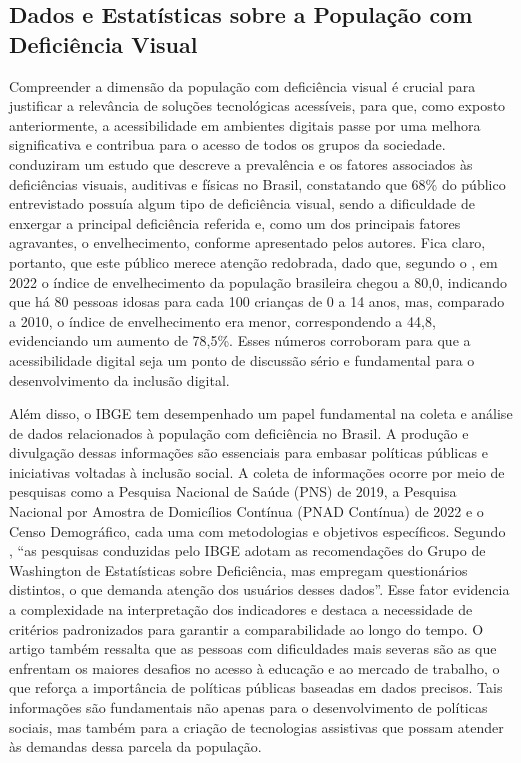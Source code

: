 \subsection{Dados e Estatísticas sobre a População com Deficiência Visual}

Compreender a dimensão da população com deficiência visual é crucial para justificar a relevância de soluções tecnológicas acessíveis, para que, como exposto anteriormente, a acessibilidade em ambientes digitais passe por uma melhora significativa e contribua para o acesso de todos os grupos da sociedade.  conduziram um estudo que descreve a prevalência e os fatores associados às deficiências visuais, auditivas e físicas no Brasil, constatando que 68\% do público entrevistado possuía algum tipo de deficiência visual, sendo a dificuldade de enxergar a principal deficiência referida e, como um dos principais fatores agravantes, o envelhecimento, conforme apresentado pelos autores. Fica claro, portanto, que este público merece atenção redobrada, dado que, segundo o , em 2022 o índice de envelhecimento da população brasileira chegou a 80,0, indicando que há 80 pessoas idosas para cada 100 crianças de 0 a 14 anos, mas, comparado a 2010, o índice de envelhecimento era menor, correspondendo a 44,8, evidenciando um aumento de 78,5\%. Esses números corroboram para que a acessibilidade digital seja um ponto de discussão sério e fundamental para o desenvolvimento da inclusão digital.

Além disso, o IBGE tem desempenhado um papel fundamental na coleta e análise de dados relacionados à população com deficiência no Brasil. A produção e divulgação dessas informações são essenciais para embasar políticas públicas e iniciativas voltadas à inclusão social. A coleta de informações ocorre por meio de pesquisas como a Pesquisa Nacional de Saúde (PNS) de 2019, a Pesquisa Nacional por Amostra de Domicílios Contínua (PNAD Contínua) de 2022 e o Censo Demográfico, cada uma com metodologias e objetivos específicos. Segundo , “as pesquisas conduzidas pelo IBGE adotam as recomendações do Grupo de Washington de Estatísticas sobre Deficiência, mas empregam questionários distintos, o que demanda atenção dos usuários desses dados”. Esse fator evidencia a complexidade na interpretação dos indicadores e destaca a necessidade de critérios padronizados para garantir a comparabilidade ao longo do tempo. O artigo também ressalta que as pessoas com dificuldades mais severas são as que enfrentam os maiores desafios no acesso à educação e ao mercado de trabalho, o que reforça a importância de políticas públicas baseadas em dados precisos. Tais informações são fundamentais não apenas para o desenvolvimento de políticas sociais, mas também para a criação de tecnologias assistivas que possam atender às demandas dessa parcela da população.

